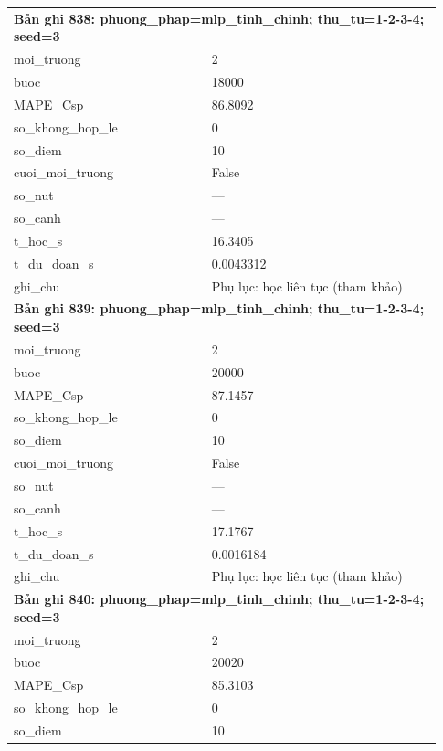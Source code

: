 \begin{longtable}{p{0.43\linewidth}p{0.50\linewidth}}
\midrule
\multicolumn{2}{p{0.95\linewidth}}{\textbf{Bản ghi 838: phuong\_phap=mlp\_tinh\_chinh; thu\_tu=1-2-3-4; seed=3}} \\
moi\_\allowbreak truong & 2 \\
buoc & 18000 \\
MAPE\_\allowbreak Csp & 86.8092 \\
so\_\allowbreak khong\_\allowbreak hop\_\allowbreak le & 0 \\
so\_\allowbreak diem & 10 \\
cuoi\_\allowbreak moi\_\allowbreak truong & False \\
so\_\allowbreak nut & — \\
so\_\allowbreak canh & — \\
t\_\allowbreak hoc\_\allowbreak s & 16.3405 \\
t\_\allowbreak du\_\allowbreak doan\_\allowbreak s & 0.0043312 \\
ghi\_\allowbreak chu & Phụ lục: học liên tục (tham khảo) \\
\midrule
\multicolumn{2}{p{0.95\linewidth}}{\textbf{Bản ghi 839: phuong\_phap=mlp\_tinh\_chinh; thu\_tu=1-2-3-4; seed=3}} \\
moi\_\allowbreak truong & 2 \\
buoc & 20000 \\
MAPE\_\allowbreak Csp & 87.1457 \\
so\_\allowbreak khong\_\allowbreak hop\_\allowbreak le & 0 \\
so\_\allowbreak diem & 10 \\
cuoi\_\allowbreak moi\_\allowbreak truong & False \\
so\_\allowbreak nut & — \\
so\_\allowbreak canh & — \\
t\_\allowbreak hoc\_\allowbreak s & 17.1767 \\
t\_\allowbreak du\_\allowbreak doan\_\allowbreak s & 0.0016184 \\
ghi\_\allowbreak chu & Phụ lục: học liên tục (tham khảo) \\
\midrule
\multicolumn{2}{p{0.95\linewidth}}{\textbf{Bản ghi 840: phuong\_phap=mlp\_tinh\_chinh; thu\_tu=1-2-3-4; seed=3}} \\
moi\_\allowbreak truong & 2 \\
buoc & 20020 \\
MAPE\_\allowbreak Csp & 85.3103 \\
so\_\allowbreak khong\_\allowbreak hop\_\allowbreak le & 0 \\
so\_\allowbreak diem & 10 \\

\end{longtable}
